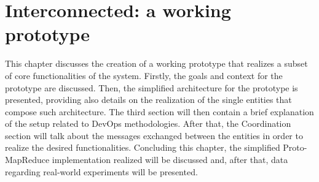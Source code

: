 \chapter{Interconnected: a working prototype}
This chapter discusses the creation of a working prototype that realizes a subset of core functionalities of the system. Firstly, the goals and context for the prototype are discussed. Then, the simplified architecture for the prototype is presented, providing also details on the realization of the single entities that compose such architecture. The third section will then contain a brief explanation of the setup related to DevOps methodologies. After that, the Coordination section will talk about the messages exchanged between the entities in order to realize the desired functionalities. Concluding this chapter, the simplified Proto-MapReduce implementation realized will be discussed and, after that, data regarding real-world experiments will be presented. 






